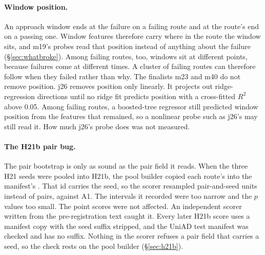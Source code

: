 \paragraph{Window position.}
An approach window ends at the failure on a failing route and at the route's
end on a passing one. Window features therefore carry where in the route the
window sits, and m19's probes read that position instead of anything about the
failure (\S\ref{sec:whatbroke}). Among failing routes, too, windows sit at
different points, because failures come at different times. A cluster of
failing routes can therefore follow when they failed rather than why. The finalists m23 and m40 do not
remove position.
j26 removes position only linearly. It projects out ridge-regression
directions until no ridge fit predicts position with a cross-fitted $R^2$ above
0.05. Among failing routes, a boosted-tree regressor still predicted window
position from the features that remained, so a nonlinear probe such as j26's
may still read it. How much j26's probe does was not measured.

\paragraph{The H21b pair bug.}
The pair bootstrap is only as sound as the pair field it reads. When the three
H21 seeds were pooled into H21b, the pool builder copied each route's
 into the manifest's . That id carries the seed, so
the scorer resampled pair-and-seed units instead of pairs, against A1. The
intervals it recorded were too narrow and the $p$ values too small. The point
scores were not affected. An independent scorer written from the pre-registration text
caught it. Every later H21b score uses a manifest copy with the seed suffix
stripped, and the UniAD test manifest was checked and has no suffix. Nothing in
the scorer refuses a pair field that carries a seed, so the check rests on the
pool builder (\S\ref{sec:h21b}).


